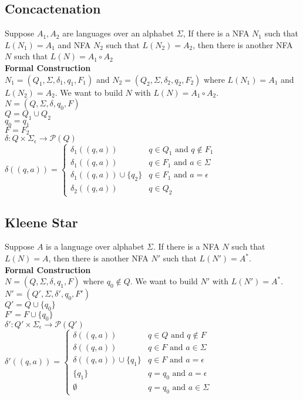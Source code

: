 \documentclass{article}
\begin{document}
\subsection{Concactenation}
Suppose $A_1,A_2$ are languages over an alphabet $\Sigma$, If there is a NFA $N_1$ such that $L(N_1)=A_1$ and NFA $N_2$ such that $L(N_2)=A_2$, then there is another NFA $N$ such that $L(N)=A_1\circ A_2$\\
\textbf{Formal Construction}\\
$N_1=(Q_1,\Sigma,\delta_1,q_1,F_1)$ and $N_2=(Q_2,\Sigma,\delta_2,q_2,F_2)$ where $L(N_1)=A_1$ and $L(N_2)=A_2$. We want to build $N$ with $L(N)=A_1\circ A_2$.\\
$N=(Q,\Sigma,\delta,q_0,F)$\\
$Q=Q_1\cup Q_2$\\
$q_0=q_1$\\
$F=F_2$\\
$\delta:Q\times\Sigma_\epsilon\rightarrow\mathcal{P}(Q)$\\
$\delta((q,a))=\begin{cases}
    \delta_1((q,a))&q\in Q_1\text{ and } q\notin F_1\\
    \delta_1((q,a))&q\in F_1\text{ and }a\in\Sigma\\
    \delta_1((q,a))\cup\{q_2\}&q\in F_1\text{ and }a=\epsilon\\
    \delta_2((q,a))&q\in Q_2
\end{cases}$
\newpage
\subsection{Kleene Star}
Suppose $A$ is a language over alphabet $\Sigma$. If there is a NFA $N$ such that $L(N)=A$, then there is another NFA $N'$ such that $L(N')=A^*$.\\
\textbf{Formal Construction}\\
$N=(Q,\Sigma,\delta,q_1,F)$ where $q_0\notin Q$. We want to build $N'$ with $L(N')=A^*$.\\
$N'=(Q',\Sigma,\delta',q_0,F')$\\
$Q'=Q\cup \{q_0\}$\\
$F'=F\cup\{q_0\}$\\
$\delta':Q'\times\Sigma_\epsilon\rightarrow\mathcal{P}(Q')$\\
$\delta'((q,a))=\begin{cases}
    \delta((q,a))&q\in Q\text{ and }q\notin F\\
    \delta((q,a))&q\in F\text{ and }a\in\Sigma\\
    \delta((q,a))\cup\{q_1\}&q\in F\text{ and }a=\epsilon\\
    \{q_1\}&q=q_0\text{ and }a=\epsilon\\
    \emptyset&q=q_0\text{ and }a\in\Sigma
\end{cases}$
\end{document}
